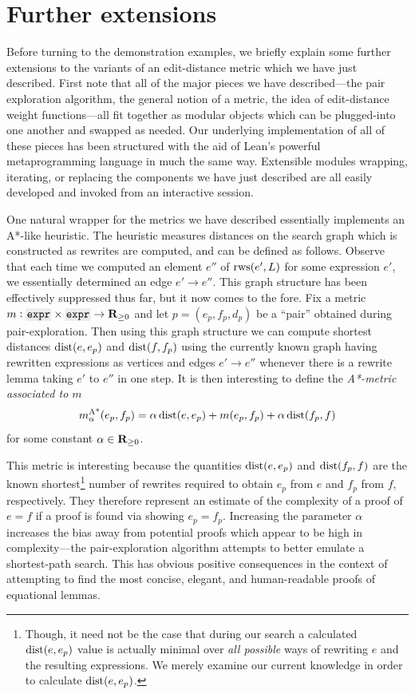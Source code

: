 \documentclass[12pt]{easychair}
\begin{document}
\section{Further extensions}

Before turning to the demonstration examples, we briefly explain some further extensions to the variants of an edit-distance metric which we have just described. First note that all of the major pieces we have described---the pair exploration algorithm, the general notion of a metric, the idea of edit-distance weight functions---all fit together as modular objects which can be plugged-into one another and swapped as needed. Our underlying implementation of all of these pieces has been structured with the aid of Lean's powerful metaprogramming language in much the same way. Extensible modules wrapping, iterating, or replacing the components we have just described are all easily developed and invoked from an interactive session.

One natural wrapper for the metrics we have described essentially implements an A*-like heuristic. The heuristic measures distances on the search graph which is constructed as rewrites are computed, and can be defined as follows. Observe that each time we computed an element $e''$ of $\operatorname{rws}(e', L)$ for some expression $e'$, we essentially determined an edge $e' \to e''$. This graph structure has been effectively suppressed thus far, but it now comes to the fore. Fix a metric $m : \expr{} \times \expr{} \to \RR_{\geq 0}$ and let $p = (e_p, f_p, d_p)$ be a ``pair'' obtained during pair-exploration. Then using this graph structure we can compute shortest distances $\operatorname{dist}(e, e_p)$ and $\operatorname{dist}(f, f_p)$ using the currently known graph having rewritten expressions as vertices and edges $e' \to e''$ whenever there is a rewrite lemma taking $e' $ to $e''$ in one step. It is then interesting to define the \textit{A*-metric associated to $m$}
\begin{equation*}
  m^\text{A*}_{\alpha}(e_p, f_p) = \alpha \operatorname{dist}(e, e_p) + m(e_p, f_p) + \alpha \operatorname{dist}(f_p, f)
\end{equation*}
for some constant $\alpha \in \mathbf{R}_{\geq 0}$.

This metric is interesting because the quantities $\operatorname{dist}(e, e_p)$ and $\operatorname{dist}(f_p, f)$ are the known shortest\footnote{Though, it need not be the case that during our search a calculated $\operatorname{dist}(e, e_p)$ value is actually minimal over \textit{all possible} ways of rewriting $e$ and the resulting expressions. We merely examine our current knowledge in order to calculate $\operatorname{dist}(e, e_p)$.} number of rewrites required to obtain $e_p$ from $e$ and $f_p$ from $f$, respectively. They therefore represent an estimate of the complexity of a proof of $e = f$ if a proof is found via showing $e_p = f_p$. Increasing the parameter $\alpha$ increases the bias away from potential proofs which appear to be high in complexity---the pair-exploration algorithm attempts to better emulate a shortest-path search. This has obvious positive consequences in the context of attempting to find the most concise, elegant, and human-readable proofs of equational lemmas.
\end{document}
